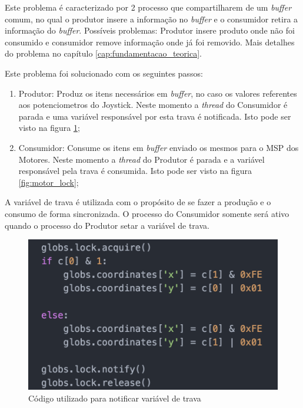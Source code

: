   Este problema é caracterizado por 2 processo que compartilharem de um \textit{buffer} comum, no qual o produtor insere a informação no \textit{buffer} e o consumidor retira a informação do \textit{buffer}. Possíveis problemas: Produtor insere produto onde não foi consumido e consumidor remove informação onde já foi removido. Mais detalhes do problema no capítulo \ref{cap:fundamentacao_teorica}.

  Este problema foi solucionado com os seguintes passos:
  \begin{enumerate}
    \item Produtor: Produz os itens necessários em \textit{buffer}, no caso os valores referentes aos potenciometros do Joystick. Neste momento a \textit{thread} do Consumidor é parada e uma variável responsável por esta trava é notificada. Isto pode ser visto na figura \ref{fig:joy_lock};
    \item Consumidor: Consume os itens em \textit{buffer} enviado os mesmos para o MSP dos Motores. Neste momento a \textit{thread} do Produtor é parada e a variável responsável pela trava é consumida. Isto pode ser visto na figura \ref{fig:motor_lock};
  \end{enumerate}

  A variável de trava é utilizada com o propósito de se fazer a produção e o consumo de forma sincronizada. O processo do Consumidor somente será ativo quando o processo do Produtor setar a variável de trava.

  \begin{figure}[!htb]
  \centering
  \includegraphics[keepaspectratio=true,scale=0.5]{figuras/resultados/joy_lock}
  \caption{Código utilizado para notificar variável de trava}
  \label{fig:joy_lock}
  \end{figure}

